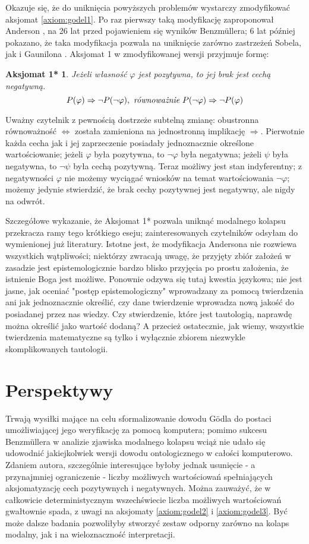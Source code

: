 \documentclass{article}
\newtheorem*{axiom-a}{Aksjomat 1*}
\begin{document}
Okazuje się, że do uniknięcia powyższych problemów wystarczy zmodyfikować aksjomat \ref{axiom:godel1}. Po raz pierwszy taką modyfikację zaproponował Anderson \cite{Anderson1990}, na 26 lat przed pojawieniem się wyników Benzmüllera; 6 lat później pokazano, że taka modyfikacja pozwala na uniknięcie zarówno zastrzeżeń Sobela, jak i Gaunilona \cite{Anderson1996}. Aksjomat 1 w zmodyfikowanej wersji przyjmuje formę:
\begin{axiom-a}
	Jeżeli własność $\varphi$ jest pozytywna, to jej brak jest cechą negatywną.
	\begin{equation*}
	P(\varphi) \Rightarrow \neg P(\neg \varphi),\ \emph{równoważnie}\ P(\neg \varphi) \Rightarrow \neg P(\varphi)
	\end{equation*}
\end{axiom-a}
Uważny czytelnik z pewnością dostrzeże subtelną zmianę: obustronna równoważność $\Leftrightarrow$ została zamieniona na jednostronną implikację $\Rightarrow$. Pierwotnie każda cecha jak i jej zaprzeczenie posiadały jednoznacznie określone wartościowanie; jeżeli $\varphi$ była pozytywna, to $\neg \varphi$ była negatywna; jeżeli $\psi$ była negatywna, to $\neg \psi$ była cechą pozytywną. Teraz możliwy jest stan indyferentny; z negatywności $\varphi$ nie możemy wyciągać wniosków na temat wartościowania $\neg \varphi$; możemy jedynie stwierdzić, że brak cechy pozytywnej jest negatywny, ale nigdy na odwrót. 

Szczegółowe wykazanie, że Aksjomat 1* pozwala uniknąć modalnego kolapsu przekracza ramy tego krótkiego eseju; zainteresowanych czytelników odsyłam do wymienionej już literatury. Istotne jest, że modyfikacja Andersona nie rozwiewa wszystkich wątpliwości; niektórzy zwracają uwagę, że przyjęty zbiór założeń w zasadzie jest epistemologicznie bardzo blisko przyjęcia po prostu założenia, że istnienie Boga jest możliwe. Ponownie odzywa się tutaj kwestia językowa; nie jest jasne, jak oceniać "postęp epistemologiczny" wprowadzany za pomocą twierdzenia ani jak jednoznacznie określić, czy dane twierdzenie wprowadza nową jakość do posiadanej przez nas wiedzy. Czy stwierdzenie, które jest tautologią, naprawdę można określić jako wartość dodaną? A przecież ostatecznie, jak wiemy, wszystkie twierdzenia matematyczne są tylko i wyłącznie zbiorem niezwykle skomplikowanych tautologii. 

\section{Perspektywy}
Trwają wysiłki mające na celu sformalizowanie dowodu Gödla do postaci umożliwiającej jego weryfikację za pomocą komputera; pomimo sukcesu Benzmüllera w analizie zjawiska modalnego kolapsu wciąż nie udało się udowodnić jakiejkolwiek wersji dowodu ontologicznego w całości komputerowo. Zdaniem autora, szczególnie interesujące byłoby jednak usunięcie - a przynajmniej ograniczenie - liczby możliwych wartościowań spełniających aksjomatyzację cech pozytywnych i negatywnych. Można zauważyć, że w całkowicie deterministycznym wszechświecie liczba możliwych wartościowań gwałtownie spada, z uwagi na aksjomaty \ref{axiom:godel2} i \ref{axiom:godel3}. Być może dalsze badania pozwoliłyby stworzyć zestaw odporny zarówno na kolaps modalny, jak i na wieloznaczność interpretacji. 



\end{document}
